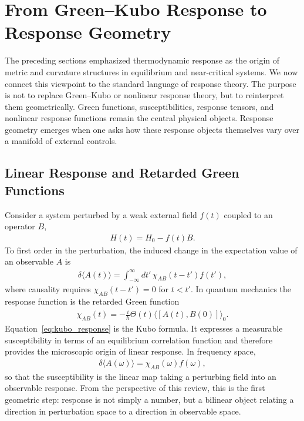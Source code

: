 \section{From Green--Kubo Response to Response Geometry}
\label{sec:kubo_response_geometry}
The preceding sections emphasized thermodynamic response as
the origin of metric and curvature structures in equilibrium and
near-critical systems. We now connect this viewpoint to the
standard language of response theory. The purpose is not to
replace Green--Kubo or nonlinear response theory, but to
reinterpret them geometrically. Green functions, susceptibilities,
response tensors, and nonlinear response functions remain the
central physical objects. Response geometry emerges when one
asks how these response objects themselves vary over a manifold
of external controls.

\subsection{Linear Response and Retarded Green Functions}
Consider a system perturbed by a weak external field \(f(t)\)
coupled to an operator \(B\),
\begin{align}
H(t)=H_0-f(t)B .
\end{align}
To first order in the perturbation, the induced change in the
expectation value of an observable \(A\) is
\begin{align}
\delta\langle A(t)\rangle
=
\int_{-\infty}^{\infty}dt'\,
\chi_{AB}(t-t')f(t'),
\end{align}
where causality requires \(\chi_{AB}(t-t')=0\) for
\(t<t'\). In quantum mechanics the response function is the
retarded Green function
\begin{align}
\chi_{AB}(t)
=
-\frac{i}{\hbar}\Theta(t)
\langle [A(t),B(0)]\rangle_0 .
\label{eq:kubo_response}
\end{align}
Equation~\eqref{eq:kubo_response} is the Kubo formula. It
expresses a measurable susceptibility in terms of an equilibrium
correlation function and therefore provides the microscopic
origin of linear response.
In frequency space,
\begin{align}
\delta\langle A(\omega)\rangle
=
\chi_{AB}(\omega)f(\omega),
\end{align}
so that the susceptibility is the linear map taking a perturbing
field into an observable response. From the perspective of this
review, this is the first geometric step: response is not simply a
number, but a bilinear object relating a direction in perturbation
space to a direction in observable space.

